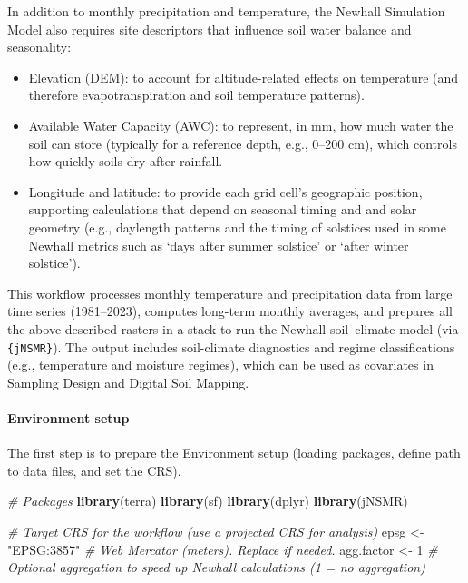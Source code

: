 \documentclass[
  10pt,
  b5paper,
  oneside]{book}
\newenvironment{Shaded}{\begin{snugshade}}{\end{snugshade}}
\newcommand{\CommentTok}[1]{\textcolor[rgb]{0.56,0.35,0.01}{\textit{#1}}}
\newcommand{\DecValTok}[1]{\textcolor[rgb]{0.00,0.00,0.81}{#1}}
\newcommand{\FunctionTok}[1]{\textcolor[rgb]{0.13,0.29,0.53}{\textbf{#1}}}
\newcommand{\NormalTok}[1]{#1}
\newcommand{\OtherTok}[1]{\textcolor[rgb]{0.56,0.35,0.01}{#1}}
\newcommand{\StringTok}[1]{\textcolor[rgb]{0.31,0.60,0.02}{#1}}
\begin{document}
In addition to monthly precipitation and temperature, the Newhall Simulation Model also requires site descriptors that influence soil water balance and seasonality:

\begin{itemize}
\item
  Elevation (DEM): to account for altitude-related effects on temperature (and therefore evapotranspiration and soil temperature patterns).
\item
  Available Water Capacity (AWC): to represent, in mm, how much water the soil can store (typically for a reference depth, e.g., 0--200 cm), which controls how quickly soils dry after rainfall.
\item
  Longitude and latitude: to provide each grid cell's geographic position, supporting calculations that depend on seasonal timing and and solar geometry (e.g., daylength patterns and the timing of solstices used in some Newhall metrics such as `days after summer solstice' or `after winter solstice').
\end{itemize}

This workflow processes monthly temperature and precipitation data from large time series (1981--2023), computes long-term monthly averages, and prepares all the above described rasters in a stack to run the Newhall soil--climate model (via \texttt{\{jNSMR\}}). The output includes soil-climate diagnostics and regime classifications (e.g., temperature and moisture regimes), which can be used as covariates in Sampling Design and Digital Soil Mapping.

\paragraph*{Environment setup}\label{environment-setup}

The first step is to prepare the Environment setup (loading packages, define path to data files, and set the CRS).

\begin{Shaded}
\begin{Highlighting}[]
\CommentTok{\# Packages}
\FunctionTok{library}\NormalTok{(terra)}
\FunctionTok{library}\NormalTok{(sf)}
\FunctionTok{library}\NormalTok{(dplyr)}
\FunctionTok{library}\NormalTok{(jNSMR)}

\CommentTok{\# Target CRS for the workflow (use a projected CRS for analysis)}
\NormalTok{epsg }\OtherTok{\textless{}{-}} \StringTok{"EPSG:3857"}   \CommentTok{\# Web Mercator (meters). Replace if needed.}
\NormalTok{agg.factor }\OtherTok{\textless{}{-}} \DecValTok{1}       \CommentTok{\# Optional aggregation to speed up Newhall calculations (1 = no aggregation)}
\end{Highlighting}
\end{Shaded}
\end{document}
